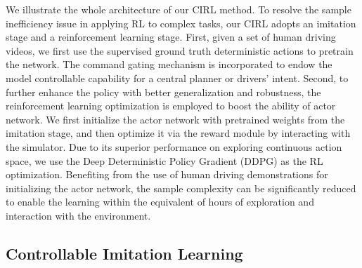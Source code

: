 \documentclass[runningheads]{llncs}
\begin{document}
We illustrate the whole architecture of our CIRL method. To resolve the sample inefficiency issue in applying RL to complex tasks, our CIRL adopts an imitation stage and a reinforcement learning stage. First, given a set of human driving videos, we first use the supervised ground truth deterministic actions to pretrain the network. The command gating mechanism is incorporated to endow the model controllable capability for a central planner or drivers' intent. Second, to further enhance the policy with better generalization and robustness, the reinforcement learning optimization is employed to boost the ability of actor network. We first initialize the actor network with pretrained weights from the imitation stage, and then optimize it via the reward module by interacting with the simulator. Due to its superior performance on exploring continuous action space, we use the Deep Deterministic Policy Gradient (DDPG) as the RL optimization. Benefiting from the use of human driving demonstrations for initializing the actor network, the sample complexity can be significantly reduced to enable the learning within the equivalent of hours of exploration and interaction with the environment.


    
\subsection{Controllable Imitation Learning}
\end{document}
